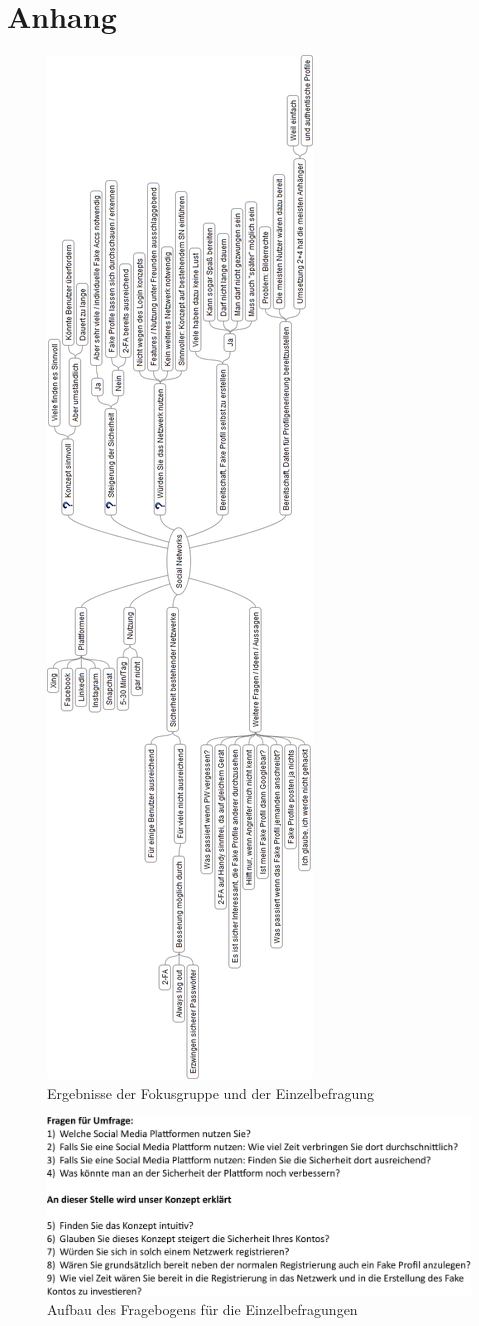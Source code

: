 \documentclass{sigchi}
\begin{document}
\section{Anhang}
\begin{figure}[h]
	\centering
	\includegraphics[height=0.76\textheight]{figures/Social-Networks.png}
	\caption{Ergebnisse der Fokusgruppe und der Einzelbefragung}
	\label{fig:MindMapAnhang}
\end{figure}
\newpage
\begin{figure}[h]
	\centering
	\includegraphics[width=0.8\columnwidth]{figures/Fragebogen.pdf}
	\caption{Aufbau des Fragebogens für die Einzelbefragungen}
	\label{fig:Fragebogen}
\end{figure}
\end{document}
